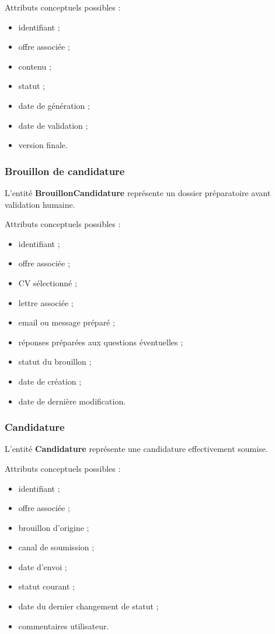 \documentclass[11pt,a4paper]{article}
\begin{document}
Attributs conceptuels possibles :
\begin{itemize}
    \item identifiant ;
    \item offre associée ;
    \item contenu ;
    \item statut ;
    \item date de génération ;
    \item date de validation ;
    \item version finale.
\end{itemize}

\subsubsection{Brouillon de candidature}

L’entité \textbf{BrouillonCandidature} représente un dossier préparatoire avant validation humaine.

Attributs conceptuels possibles :
\begin{itemize}
    \item identifiant ;
    \item offre associée ;
    \item CV sélectionné ;
    \item lettre associée ;
    \item email ou message préparé ;
    \item réponses préparées aux questions éventuelles ;
    \item statut du brouillon ;
    \item date de création ;
    \item date de dernière modification.
\end{itemize}

\subsubsection{Candidature}

L’entité \textbf{Candidature} représente une candidature effectivement soumise.

Attributs conceptuels possibles :
\begin{itemize}
    \item identifiant ;
    \item offre associée ;
    \item brouillon d’origine ;
    \item canal de soumission ;
    \item date d’envoi ;
    \item statut courant ;
    \item date du dernier changement de statut ;
    \item commentaires utilisateur.
\end{itemize}
\end{document}
